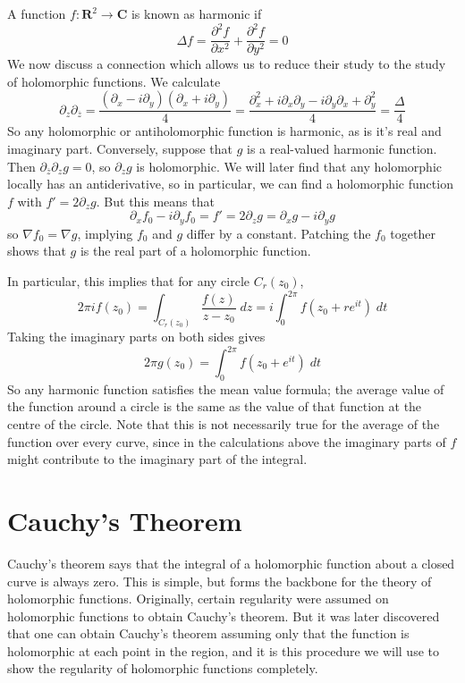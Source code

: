A function $f: \mathbf{R}^2 \to \mathbf{C}$ is known as harmonic if
%
\[ \Delta f = \frac{\partial^2 f}{\partial x^2} + \frac{\partial^2 f}{\partial y^2} = 0 \]
%
We now discuss a connection which allows us to reduce their study to the study of holomorphic functions. We calculate
%
\[ \partial_z \partial_{\overline{z}} = \frac{(\partial_x - i \partial_y)(\partial_x + i \partial_y)}{4} = \frac{\partial^2_x + i \partial_x \partial_y - i \partial_y \partial_x + \partial_y^2}{4} = \frac{\Delta}{4} \]
%
So any holomorphic or antiholomorphic function is harmonic, as is it's real and imaginary part. Conversely, suppose that $g$ is a real-valued harmonic function. Then $\partial_{\overline{z}} \partial_z g = 0$, so $\partial_z g$ is holomorphic. We will later find that any holomorphic locally has an antiderivative, so in particular, we can find a holomorphic function $f$ with $f' = 2 \partial_z g$. But this means that
%
\[ \partial_x f_0 - i \partial_y f_0 = f' = 2 \partial_z g = \partial_x g - i \partial_y g \]
%
so $\nabla f_0 = \nabla g$, implying $f_0$ and $g$ differ by a constant. Patching the $f_0$ together shows that $g$ is the real part of a holomorphic function.

In particular, this implies that for any circle $C_r(z_0)$,
%
\[ 2 \pi i f(z_0) = \int_{C_r(z_0)} \frac{f(z)}{z - z_0}\; dz = i \int_0^{2\pi} f(z_0 + r e^{it})\; dt  \]
%
Taking the imaginary parts on both sides gives
%
\[ 2 \pi g(z_0) = \int_0^{2\pi} f(z_0 + e^{it})\; dt \]
%
So any harmonic function satisfies the mean value formula; the average value of the function around a circle is the same as the value of that function at the centre of the circle. Note that this is not necessarily true for the average of the function over every curve, since in the calculations above the imaginary parts of $f$ might contribute to the imaginary part of the integral.







\chapter{Cauchy's Theorem}

Cauchy's theorem says that the integral of a holomorphic function about a closed curve is always zero. This is simple, but forms the backbone for the theory of holomorphic functions. Originally, certain regularity were assumed on holomorphic functions to obtain Cauchy's theorem. But it was later discovered that one can obtain Cauchy's theorem assuming only that the function is holomorphic at each point in the region, and it is this procedure we will use to show the regularity of holomorphic functions completely.

